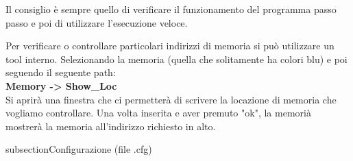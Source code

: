 Il consiglio è sempre quello di verificare il funzionamento del programma passo passo e poi di utilizzare l'esecuzione veloce.

Per verificare o controllare particolari indirizzi di memoria si può utilizzare un tool interno.
Selezionando la memoria (quella che solitamente ha colori blu) e poi seguendo il seguente path:
\\
\textbf{Memory -> Show\_Loc}
\\
Si aprirà una finestra che ci permetterà di scrivere la locazione di memoria che vogliamo controllare. Una volta inserita e aver premuto "ok", la memorià mostrerà la memoria all'indirizzo richiesto in alto.

subsection{Configurazione (file .cfg)} \label{par:cfg}
